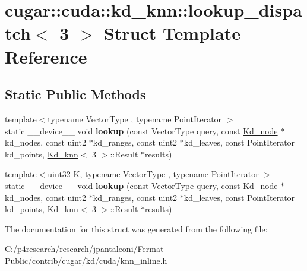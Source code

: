 \hypertarget{structcugar_1_1cuda_1_1kd__knn_1_1lookup__dispatch_3_013_01_4}{}\section{cugar\+:\+:cuda\+:\+:kd\+\_\+knn\+:\+:lookup\+\_\+dispatch$<$ 3 $>$ Struct Template Reference}
\label{structcugar_1_1cuda_1_1kd__knn_1_1lookup__dispatch_3_013_01_4}
\subsection*{Static Public Methods}
\begin{DoxyCompactItemize}
\item 
\mbox{\label{structcugar_1_1cuda_1_1kd__knn_1_1lookup__dispatch_3_013_01_4_a5cb1e6bb525c52ab27cfd8e1b734544f}} 
{\footnotesize template$<$typename Vector\+Type , typename Point\+Iterator $>$ }\\static \+\_\+\+\_\+device\+\_\+\+\_\+ void {\bfseries lookup} (const Vector\+Type query, const \hyperlink{structcugar_1_1_kd__node}{Kd\+\_\+node} $\ast$kd\+\_\+nodes, const uint2 $\ast$kd\+\_\+ranges, const uint2 $\ast$kd\+\_\+leaves, const Point\+Iterator kd\+\_\+points, \hyperlink{structcugar_1_1cuda_1_1_kd__knn}{Kd\+\_\+knn}$<$ 3 $>$\+::Result $\ast$results)
\item 
\mbox{\label{structcugar_1_1cuda_1_1kd__knn_1_1lookup__dispatch_3_013_01_4_a9c77a5dec37adaef3592871c261f1bed}} 
{\footnotesize template$<$uint32 K, typename Vector\+Type , typename Point\+Iterator $>$ }\\static \+\_\+\+\_\+device\+\_\+\+\_\+ void {\bfseries lookup} (const Vector\+Type query, const \hyperlink{structcugar_1_1_kd__node}{Kd\+\_\+node} $\ast$kd\+\_\+nodes, const uint2 $\ast$kd\+\_\+ranges, const uint2 $\ast$kd\+\_\+leaves, const Point\+Iterator kd\+\_\+points, \hyperlink{structcugar_1_1cuda_1_1_kd__knn}{Kd\+\_\+knn}$<$ 3 $>$\+::Result $\ast$results)
\end{DoxyCompactItemize}


The documentation for this struct was generated from the following file\+:\begin{DoxyCompactItemize}
\item 
C\+:/p4research/research/jpantaleoni/\+Fermat-\/\+Public/contrib/cugar/kd/cuda/knn\+\_\+inline.\+h\end{DoxyCompactItemize}
